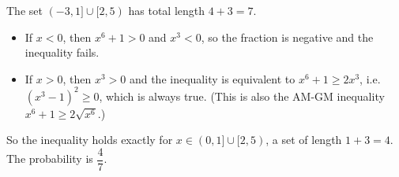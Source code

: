 The set $(-3,1]\cup[2,5)$ has total length $4+3=7$.

\begin{itemize}
\item If $x<0$, then $x^6+1>0$ and $x^3<0$, so the fraction is negative and the inequality fails.
\item If $x>0$, then $x^3>0$ and the inequality is equivalent to $x^6+1\ge2x^3$, i.e. $\left(x^3-1\right)^2\ge0$, which is always true. (This is also the AM-GM inequality $x^6+1\ge2\sqrt{x^6}$.)
\end{itemize}
So the inequality holds exactly for $x\in(0,1]\cup[2,5)$, a set of length $1+3=4$. The probability is $\boxed{\dfrac47}$.
